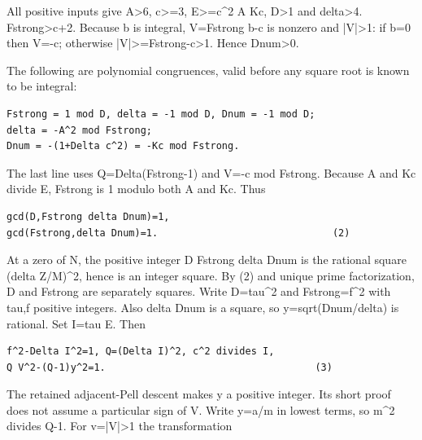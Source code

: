 All positive inputs give A\textgreater{}\allowbreak{}6, c\textgreater{}\allowbreak{}=\allowbreak{}3, E\textgreater{}\allowbreak{}=\allowbreak{}c\textasciicircum{}\allowbreak{}2 A Kc, D\textgreater{}\allowbreak{}1 and delta\textgreater{}\allowbreak{}4. Fstrong\textgreater{}\allowbreak{}c+\allowbreak{}2. Because b is integral, V=\allowbreak{}Fstrong b-c is nonzero and |V|\textgreater{}\allowbreak{}1: if b=\allowbreak{}0 then V=\allowbreak{}-c; otherwise |V|\textgreater{}\allowbreak{}=\allowbreak{}Fstrong-c\textgreater{}\allowbreak{}1. Hence Dnum\textgreater{}\allowbreak{}0.



The following are polynomial congruences, valid before any square root is known to be integral:



\begin{verbatim}
Fstrong = 1 mod D, delta = -1 mod D, Dnum = -1 mod D;
delta = -A^2 mod Fstrong;
Dnum = -(1+Delta c^2) = -Kc mod Fstrong.
\end{verbatim}

The last line uses Q=\allowbreak{}Delta(Fstrong-1) and V=\allowbreak{}-c mod Fstrong. Because A and Kc divide E, Fstrong is 1 modulo both A and Kc. Thus



\begin{verbatim}
gcd(D,Fstrong delta Dnum)=1,
gcd(Fstrong,delta Dnum)=1.                              (2)
\end{verbatim}

At a zero of N, the positive integer D Fstrong delta Dnum is the rational square (delta Z/\allowbreak{}M)\textasciicircum{}\allowbreak{}2, hence is an integer square. By (2) and unique prime factorization, D and Fstrong are separately squares. Write D=\allowbreak{}tau\textasciicircum{}\allowbreak{}2 and Fstrong=\allowbreak{}f\textasciicircum{}\allowbreak{}2 with tau,f positive integers. Also delta Dnum is a square, so y=\allowbreak{}sqrt(Dnum/\allowbreak{}delta) is rational. Set I=\allowbreak{}tau E. Then



\begin{verbatim}
f^2-Delta I^2=1, Q=(Delta I)^2, c^2 divides I,
Q V^2-(Q-1)y^2=1.                                    (3)
\end{verbatim}

The retained adjacent-Pell descent makes y a positive integer. Its short proof does not assume a particular sign of V. Write y=\allowbreak{}a/\allowbreak{}m in lowest terms, so m\textasciicircum{}\allowbreak{}2 divides Q-1. For v=\allowbreak{}|V|\textgreater{}\allowbreak{}1 the transformation



